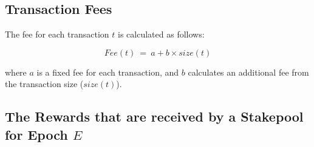 \documentclass[11pt,a4paper,dvipsnames,twosided,final]{article}
\begin{document}
\subsection{Transaction Fees}
\label{sec:fees}

The fee for each transaction $t$ is calculated as follows:

$$
\textit{Fee} (t) ~=~ a + b \times \textit{size}(t)
$$

\noindent
where $a$ is a fixed fee for each transaction, and $b$ calculates an additional fee from the transaction size ($\textit{size}(t)$).

\clearpage
\subsection{The Rewards that are received by a Stakepool for Epoch $E$}
\end{document}
